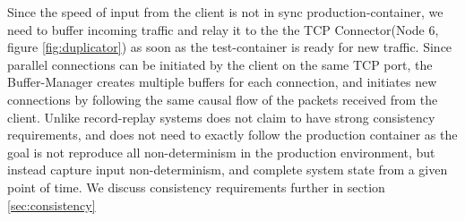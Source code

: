Since the speed of input from the client is not in sync production-container, we need to buffer incoming traffic and relay it to the the TCP Connector(Node 6, figure \ref{fig:duplicator}) as soon as the test-container is ready for new traffic. 
Since parallel connections can be initiated by the client on the same TCP port, the Buffer-Manager creates multiple buffers for each connection, and initiates new connections by following the same causal flow of the packets received from the client. 
Unlike record-replay systems \parikshan does not claim to have strong consistency requirements, and does not need to exactly follow the production container as the goal is not reproduce all non-determinism in the production environment, but instead capture input non-determinism, and complete system state from a given point of time.
We discuss consistency requirements further in section \ref{sec:consistency}

\fi
